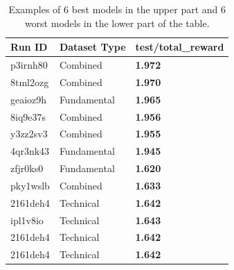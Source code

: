 \documentclass[../xlapes02]{subfiles}
\begin{document}
    \begin{table}[H]
        \centering
        \begin{tabular}{|l|l|l|}
            \hline
            \textbf{Run ID} & \textbf{Dataset Type} & \textbf{test/total\_reward}                \\ \hline
            p3irnh80        & Combined              & \textcolor[RGB]{50,150,50}{\textbf{1.972}} \\ \hline
            8tml2ozg        & Combined              & \textcolor[RGB]{50,150,50}{\textbf{1.970}} \\ \hline
            geaioz9h        & Fundamental           & \textcolor[RGB]{50,150,50}{\textbf{1.965}} \\ \hline
            8iq9e37s        & Combined              & \textcolor[RGB]{50,150,50}{\textbf{1.956}} \\ \hline
            y3zz2sv3        & Combined              & \textcolor[RGB]{50,150,50}{\textbf{1.955}} \\ \hline
            4qr3nk43        & Fundamental           & \textcolor[RGB]{50,150,50}{\textbf{1.945}} \\
            \midrule
            \midrule
            zfjr0ks0        & Fundamental           & \textcolor[RGB]{150,50,50}{\textbf{1.620}} \\ \hline
            pky1wslb        & Combined              & \textcolor[RGB]{150,50,50}{\textbf{1.633}} \\ \hline
            2161deh4        & Technical             & \textcolor[RGB]{150,50,50}{\textbf{1.642}} \\ \hline
            ipl1v8io        & Technical             & \textcolor[RGB]{150,50,50}{\textbf{1.643}} \\ \hline
            2161deh4        & Technical             & \textcolor[RGB]{150,50,50}{\textbf{1.642}} \\ \hline
            2161deh4        & Technical             & \textcolor[RGB]{150,50,50}{\textbf{1.642}} \\ \hline
        \end{tabular}
        \caption{Examples of 6 best models in the upper part and 6 worst models in the lower part of the table.}
        \label{tab:datasets-comparison}
    \end{table}
\end{document}
